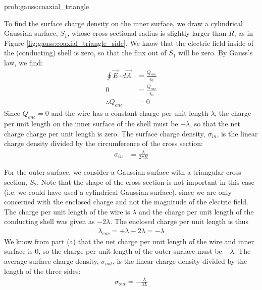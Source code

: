 \begin{solutionParts}{prob:gauss:coaxial_triangle}
{\label{soln:gauss:coaxial_triangle}
\item To find the surface charge density on the inner surface, we draw a cylindrical Gaussian surface, $S_1$, whose cross-sectional radius is slightly larger than $R$, as in Figure \ref{fig:gauss:coaxial_triangle_side}. We know that the electric field inside of the (conducting) shell is zero, so that the flux out of $S_1$ will be zero. By Gauss's law, we find:
\begin{align*}
\oint \vec E \cdot d \vec A &=\frac{Q_{enc}}{\epsilon_0}\\
0 &=\frac{Q_{enc}}{\epsilon_0}\\
\therefore Q_{enc}&=0
\end{align*}
Since $Q_{enc}=0$ and the wire has a constant charge per unit length $\lambda$, the charge per unit length on the inner surface of the shell must be $-\lambda$, so that the net charge charge per unit length is zero. The surface charge density, $\sigma_{in}$, is the linear charge density divided by the circumference of the cross section:
\begin{align*}
\sigma_{in}&=\frac{\lambda}{2\pi R}
\end{align*}

\item For the outer surface, we consider a Gaussian surface with a triangular cross section, $S_2$. Note that the shape of the cross section is not important in this case (i.e. we could have used a cylindrical Gaussian surface), since we are only concerned with the enclosed charge and not the magnitude of the electric field. \\

The charge per unit length of the wire is $\lambda$ and the charge per unit length of the conducting shell was given as $-2\lambda$. The enclosed charge per unit length is thus
\begin{align*}
\lambda_{enc}=+\lambda-2\lambda=-\lambda
\end{align*}
We know from part (a) that the net charge per unit length of the wire and inner surface is 0, so the charge per unit length of the outer surface must be $-\lambda$. The average surface charge density, $\sigma_{out}$, is the linear charge density divided by the length of the three sides:
\begin{align*}
\sigma_{out}=-\frac{\lambda}{3L}
\end{align*}
}



\end{solutionParts}


